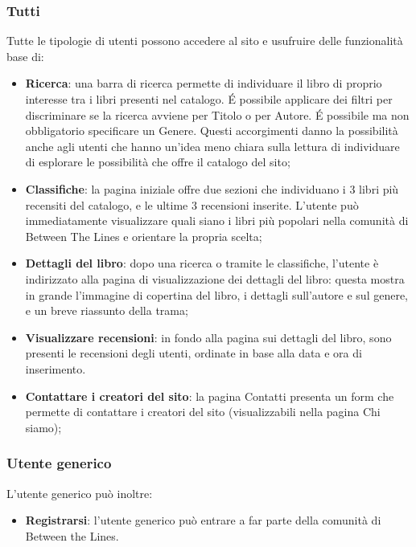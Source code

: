 \documentclass[12pt,a4paper,headings=optiontohead]{article}
\begin{document}
	\subsubsection{Tutti}
	Tutte le tipologie di utenti possono accedere al sito e usufruire delle funzionalità base di:
	\begin{itemize}
		\item \textbf{Ricerca}: una barra di ricerca permette di individuare il libro di proprio interesse tra i libri presenti nel catalogo. \'E possibile applicare dei filtri per discriminare se la ricerca avviene per Titolo o per Autore. \'E possibile ma non obbligatorio specificare un Genere. Questi accorgimenti danno la possibilità anche agli utenti che hanno un'idea meno chiara sulla lettura di individuare di esplorare le possibilità che offre il catalogo del sito;
		\item \textbf{Classifiche}: la pagina iniziale offre due sezioni che individuano i 3 libri più recensiti del catalogo, e le ultime 3 recensioni inserite. L'utente può immediatamente visualizzare quali siano i libri più popolari nella comunità di Between The Lines e orientare la propria scelta;
		\item \textbf{Dettagli del libro}: dopo una ricerca o tramite le classifiche, l'utente è indirizzato alla pagina di visualizzazione dei dettagli del libro: questa mostra in grande l'immagine di copertina del libro, i dettagli sull'autore e sul genere, e un breve riassunto della trama;
		\item \textbf{Visualizzare recensioni}: in fondo alla pagina sui dettagli del libro, sono presenti le recensioni degli utenti, ordinate in base alla data e ora di inserimento.
		\item \textbf{Contattare i creatori del sito}: la pagina Contatti presenta un form che permette di contattare i creatori del sito (visualizzabili nella pagina Chi siamo);
	\end{itemize}
	
	\subsubsection{Utente generico}
	
	L'utente generico può inoltre:
	\begin{itemize}
		\item \textbf{Registrarsi}: l'utente generico può entrare a far parte della comunità di Between the Lines.
	\end{itemize}
	
\end{document}
